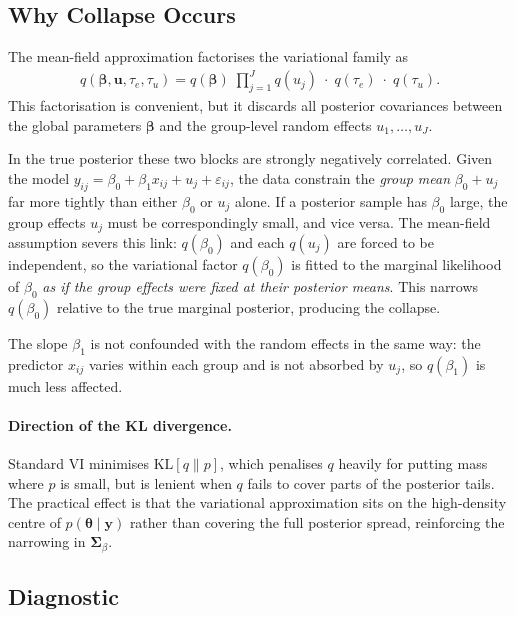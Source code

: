 \documentclass[11pt,a4paper]{article}
\begin{document}
\subsection{Why Collapse Occurs}

The mean-field approximation factorises the variational family as
\begin{align}
  q(\bm{\beta},\mathbf{u},\tau_e,\tau_u)
  = q(\bm{\beta})\;\prod_{j=1}^{J} q(u_j)\;\cdot\; q(\tau_e)\;\cdot\; q(\tau_u).
\end{align}
This factorisation is convenient, but it discards all posterior covariances
between the global parameters $\bm{\beta}$ and the group-level random effects
$u_1,\ldots,u_J$.

In the true posterior these two blocks are strongly negatively correlated.
Given the model $y_{ij} = \beta_0 + \beta_1 x_{ij} + u_j + \varepsilon_{ij}$,
the data constrain the \emph{group mean} $\beta_0 + u_j$ far more tightly
than either $\beta_0$ or $u_j$ alone.
If a posterior sample has $\beta_0$ large, the group effects $u_j$ must be
correspondingly small, and vice versa.
The mean-field assumption severs this link: $q(\beta_0)$ and each $q(u_j)$ are
forced to be independent, so the variational factor $q(\beta_0)$ is fitted to
the marginal likelihood of $\beta_0$ \emph{as if the group effects were fixed
at their posterior means}.
This narrows $q(\beta_0)$ relative to the true marginal posterior, producing
the collapse.

The slope $\beta_1$ is not confounded with the random effects in the same way:
the predictor $x_{ij}$ varies within each group and is not absorbed by $u_j$,
so $q(\beta_1)$ is much less affected.

\paragraph{Direction of the KL divergence.}
Standard VI minimises $\mathrm{KL}[q\|p]$, which penalises $q$ heavily for
putting mass where $p$ is small, but is lenient when $q$ fails to cover parts
of the posterior tails.
The practical effect is that the variational approximation sits on the
high-density centre of $p(\bm{\theta}\mid\mathbf{y})$ rather than covering
the full posterior spread, reinforcing the narrowing in $\bm{\Sigma}_\beta$.

\subsection{Diagnostic}
\end{document}
